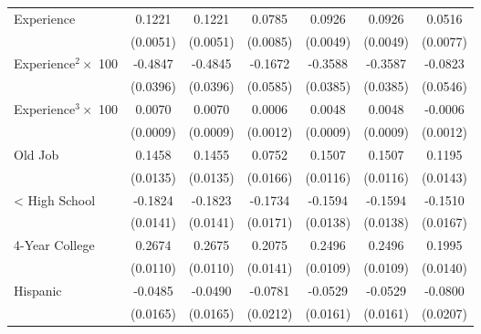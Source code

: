 {\begin{longtable}{l*{6}{c}}
Experience          &      0.1221\sym{***}&      0.1221\sym{***}&      0.0785\sym{***}&      0.0926\sym{***}&      0.0926\sym{***}&      0.0516\sym{***}\\
                    &    (0.0051)         &    (0.0051)         &    (0.0085)         &    (0.0049)         &    (0.0049)         &    (0.0077)         \\
Experience$^2\times$ 100&     -0.4847\sym{***}&     -0.4845\sym{***}&     -0.1672\sym{***}&     -0.3588\sym{***}&     -0.3587\sym{***}&     -0.0823         \\
                    &    (0.0396)         &    (0.0396)         &    (0.0585)         &    (0.0385)         &    (0.0385)         &    (0.0546)         \\
Experience$^3\times$ 100&      0.0070\sym{***}&      0.0070\sym{***}&      0.0006         &      0.0048\sym{***}&      0.0048\sym{***}&     -0.0006         \\
                    &    (0.0009)         &    (0.0009)         &    (0.0012)         &    (0.0009)         &    (0.0009)         &    (0.0012)         \\
Old Job             &      0.1458\sym{***}&      0.1455\sym{***}&      0.0752\sym{***}&      0.1507\sym{***}&      0.1507\sym{***}&      0.1195\sym{***}\\
                    &    (0.0135)         &    (0.0135)         &    (0.0166)         &    (0.0116)         &    (0.0116)         &    (0.0143)         \\
< High School       &     -0.1824\sym{***}&     -0.1823\sym{***}&     -0.1734\sym{***}&     -0.1594\sym{***}&     -0.1594\sym{***}&     -0.1510\sym{***}\\
                    &    (0.0141)         &    (0.0141)         &    (0.0171)         &    (0.0138)         &    (0.0138)         &    (0.0167)         \\
4-Year College      &      0.2674\sym{***}&      0.2675\sym{***}&      0.2075\sym{***}&      0.2496\sym{***}&      0.2496\sym{***}&      0.1995\sym{***}\\
                    &    (0.0110)         &    (0.0110)         &    (0.0141)         &    (0.0109)         &    (0.0109)         &    (0.0140)         \\
Hispanic            &     -0.0485\sym{***}&     -0.0490\sym{***}&     -0.0781\sym{***}&     -0.0529\sym{***}&     -0.0529\sym{***}&     -0.0800\sym{***}\\
                    &    (0.0165)         &    (0.0165)         &    (0.0212)         &    (0.0161)         &    (0.0161)         &    (0.0207)         \\

\end{longtable}}
